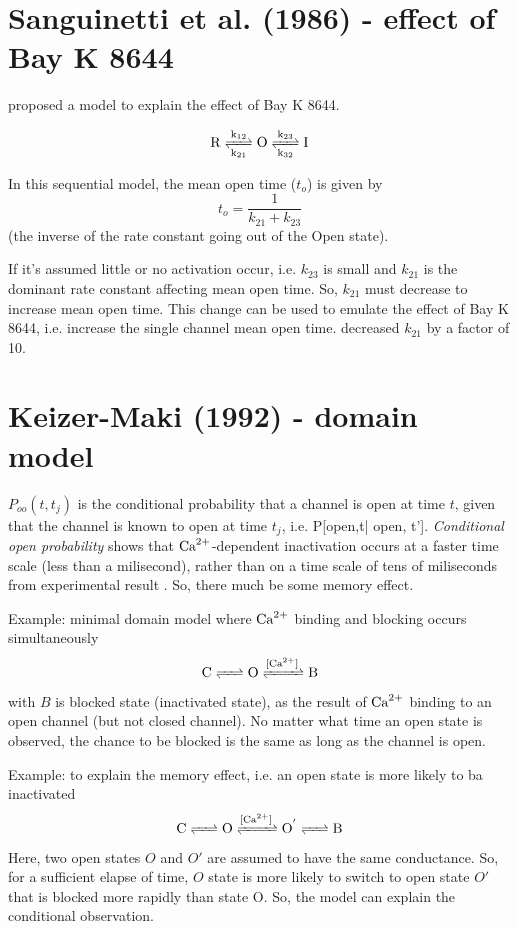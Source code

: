 \section{Sanguinetti et al. (1986) - effect of Bay K 8644}

\citep{Sanguinetti1986} proposed a model to explain the effect of Bay K 8644.

\begin{equation*}
\ce{R <=>[k_{12}][k_{21}] O <=>[k_{23}][k_{32}] I}
\end{equation*}

In this sequential model, the mean open time ($t_o$) is given by
\begin{equation}
t_o = \frac{1}{k_{21}+k_{23}}
\end{equation}
(the inverse of the rate constant going out of the Open state).

If it's assumed little or no activation occur, i.e. $k_{23}$ is small and
$k_{21}$ is the dominant rate constant affecting mean open time. So, $k_{21}$
must decrease to increase mean open time. This change can be used to emulate the
effect of Bay K 8644, i.e. increase the single channel mean open time.
\citep{Sanguinetti1986} decreased $k_{21}$ by a factor of 10.

\section{Keizer-Maki (1992) - domain model}
\label{sec:keizer-maki1992}

$P_{oo}(t,t_j)$ is the conditional probability that a channel is open at time
$t$, given that the channel is known to open at time $t_j$, i.e. P[open,t|
open, t']. {\it Conditional open probability} shows that ${\text{Ca}^{2+}}$-dependent
inactivation occurs at a faster time scale (less than a milisecond), rather than
on a time scale of tens of miliseconds from experimental result
\citep{yue1990csi}. So, there much be some memory effect.

Example: minimal domain model where ${\text{Ca}^{2+}}$ binding and blocking occurs
simultaneously
\begin{equation}
\ce{C <=> O <=>[[\Ca\text{]}] B}
\end{equation}
with $B$ is blocked state (inactivated state), as the result of ${\text{Ca}^{2+}}$ binding to
an open channel (but not closed channel). No matter what time an open state is
observed, the chance to be blocked is the same as long as the channel is open.

Example: to explain the memory effect, i.e. an open state is more likely to ba
inactivated
\begin{equation}
\ce{C <=> O <=>[[\Ca\text{]}] O^' <=> B}
\end{equation}
Here, two open states $O$ and $O'$ are assumed to have the same conductance. So,
for a sufficient elapse of time, $O$ state is more likely to switch to open state
$O'$ that is blocked more rapidly than state O. So, the model can explain the
conditional observation. 

